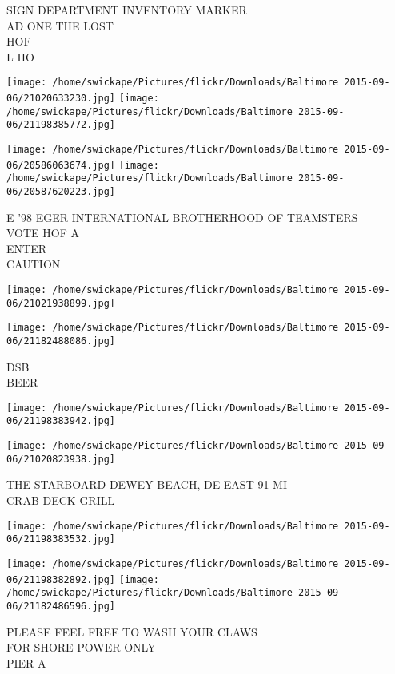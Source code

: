 \documentclass[10pt,letterpaper]{article}
\begin{document}
SIGN DEPARTMENT INVENTORY MARKER\\
AD ONE THE LOST\\
HOF\\
L HO
\pagebreak

\texttt{[image: /home/swickape/Pictures/flickr/Downloads/Baltimore 2015-09-06/21020633230.jpg]}
\texttt{[image: /home/swickape/Pictures/flickr/Downloads/Baltimore 2015-09-06/21198385772.jpg]}

\texttt{[image: /home/swickape/Pictures/flickr/Downloads/Baltimore 2015-09-06/20586063674.jpg]}
\texttt{[image: /home/swickape/Pictures/flickr/Downloads/Baltimore 2015-09-06/20587620223.jpg]}

E '98 EGER INTERNATIONAL BROTHERHOOD OF TEAMSTERS\\
VOTE HOF A\\
ENTER\\
CAUTION
\pagebreak

\texttt{[image: /home/swickape/Pictures/flickr/Downloads/Baltimore 2015-09-06/21021938899.jpg]}

\vspace{0.25in}
\texttt{[image: /home/swickape/Pictures/flickr/Downloads/Baltimore 2015-09-06/21182488086.jpg]}

DSB\\
BEER
\pagebreak

\texttt{[image: /home/swickape/Pictures/flickr/Downloads/Baltimore 2015-09-06/21198383942.jpg]}

\vspace{0.25in}
\texttt{[image: /home/swickape/Pictures/flickr/Downloads/Baltimore 2015-09-06/21020823938.jpg]}

THE STARBOARD DEWEY BEACH, DE EAST 91 MI\\
CRAB DECK GRILL
\pagebreak

\texttt{[image: /home/swickape/Pictures/flickr/Downloads/Baltimore 2015-09-06/21198383532.jpg]}

\vspace{0.25in}
\texttt{[image: /home/swickape/Pictures/flickr/Downloads/Baltimore 2015-09-06/21198382892.jpg]}
\texttt{[image: /home/swickape/Pictures/flickr/Downloads/Baltimore 2015-09-06/21182486596.jpg]}

PLEASE FEEL FREE TO WASH YOUR CLAWS\\
FOR SHORE POWER ONLY\\
PIER A
\pagebreak
\end{document}
